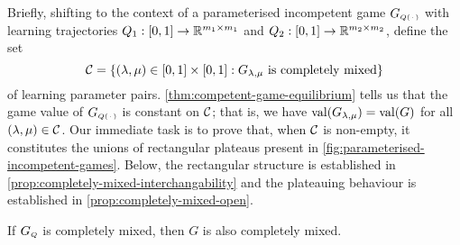     Briefly, shifting to the context of a parameterised incompetent game $G_\ms{Q(\funcdot)}$ with learning trajectories $Q_1 : [0, 1] \to \mathbb{R}^{m_1 \times m_1}$ and $Q_2 : [0, 1] \to \mathbb{R}^{m_2 \times m_2}$, define the set
    \begin{equation} \label{eq:completely-mixed-parameters}
        \mathcal{C}
            =
            \left\{
                (\lambda, \mu) \in [0, 1] \times [0, 1]
                : G_{\lambda, \mu} \text{ is completely mixed}
            \right\}
    \end{equation}
    of learning parameter pairs.
    \autoref{thm:competent-game-equilibrium} tells us that the game value of $G_\ms{Q(\funcdot)}$ is constant on $\mathcal{C}$; that is, we have $\operatorname{val}(G_{\lambda, \mu}) = \operatorname{val}(G)$ for all $(\lambda, \mu) \in \mathcal{C}$.
    Our immediate task is to prove that, when $\mathcal{C}$ is non-empty, it constitutes the unions of rectangular plateaus present in \autoref{fig:parameterised-incompetent-games}.
    Below, the rectangular structure is established in \autoref{prop:completely-mixed-interchangability} and the plateauing behaviour is established in \autoref{prop:completely-mixed-open}.

    \begin{lemma}  \label{lem:completely-mixed-competent-game}
        If $G_\ms{Q}$ is completely mixed, then $G$ is also completely mixed.
    \end{lemma}

